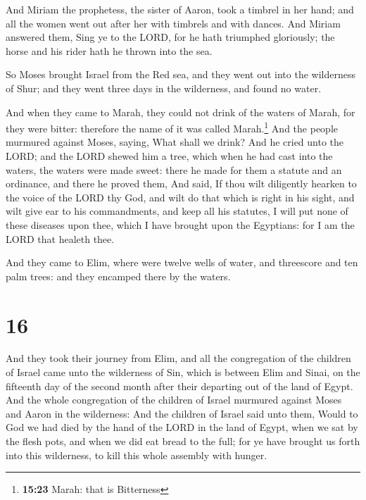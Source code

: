  And Miriam the prophetess, the sister of Aaron, took a
timbrel in her hand; and all the women went out after her with timbrels
and with dances.  And Miriam answered them, Sing ye to
the LORD, for he hath triumphed gloriously; the horse and his rider hath
he thrown into the sea.

 So Moses brought Israel from the Red sea, and they went
out into the wilderness of Shur; and they went three days in the
wilderness, and found no water.

 And when they came to Marah, they could not drink of the
waters of Marah, for they were bitter: therefore the name of it was
called Marah.\footnote{\textbf{15:23} Marah: that is Bitterness}
 And the people murmured against Moses, saying, What
shall we drink?  And he cried unto the LORD; and the LORD
shewed him a tree, which when he had cast into the waters, the waters
were made sweet: there he made for them a statute and an ordinance, and
there he proved them,  And said, If thou wilt diligently
hearken to the voice of the LORD thy God, and wilt do that which is
right in his sight, and wilt give ear to his commandments, and keep all
his statutes, I will put none of these diseases upon thee, which I have
brought upon the Egyptians: for I am the LORD that healeth thee.

 And they came to Elim, where were twelve wells of water,
and threescore and ten palm trees: and they encamped there by the
waters.

\hypertarget{section-15}{%
\section{16}\label{section-15}}

 And they took their journey from Elim, and all the
congregation of the children of Israel came unto the wilderness of Sin,
which is between Elim and Sinai, on the fifteenth day of the second
month after their departing out of the land of Egypt.  And
the whole congregation of the children of Israel murmured against Moses
and Aaron in the wilderness:  And the children of Israel
said unto them, Would to God we had died by the hand of the LORD in the
land of Egypt, when we sat by the flesh pots, and when we did eat bread
to the full; for ye have brought us forth into this wilderness, to kill
this whole assembly with hunger.

